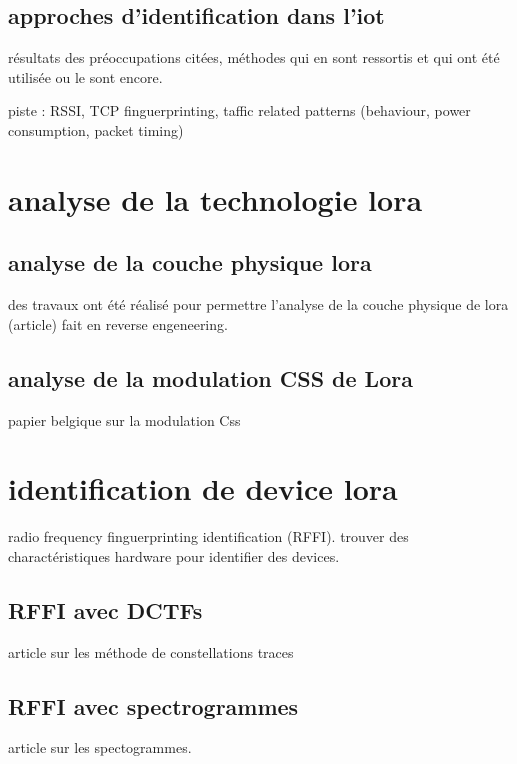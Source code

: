 \subsection{approches d'identification dans l'iot}

résultats des préoccupations citées, méthodes qui en sont ressortis et qui ont été utilisée ou le sont encore.

piste : RSSI, TCP finguerprinting, taffic related patterns (behaviour, power consumption, packet timing) 

\section{analyse de la technologie lora}

\subsection{analyse de la couche physique lora}

des travaux ont été réalisé pour permettre l'analyse de la couche physique de lora (article)
fait en reverse engeneering. 

\subsection{analyse de la modulation CSS de Lora}

papier belgique sur la modulation Css

\section{identification de device lora}

radio frequency finguerprinting identification (RFFI). trouver des charactéristiques hardware pour identifier des devices.

\subsection{RFFI avec DCTFs}
article sur les méthode de constellations traces

\subsection{RFFI avec spectrogrammes}
article sur les spectogrammes.